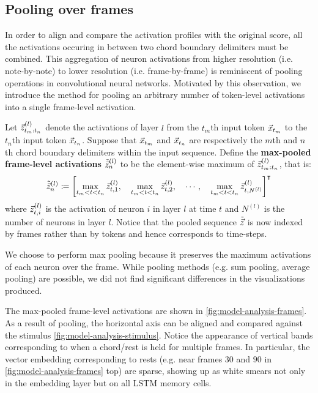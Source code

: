 \documentclass[dissertation.tex]{subfiles}
\begin{document}
\subsection{Pooling over frames}

In order to align and compare the activation profiles with the original score,
all the activations occuring in between two chord boundary delimiters must be
combined. This aggregation of neuron activations from higher resolution (i.e.
note-by-note) to lower resolution (i.e. frame-by-frame) is reminiscent of
pooling operations in convolutional neural networks. Motivated by
this observation, we introduce the method for pooling an arbitrary number of
token-level activations into a single frame-level activation.

Let $\vec{z}^{(l)}_{{t_m}:{t_n}}$ denote the activations of layer $l$ from the $t_m$th input token $\vec{x}_{t_m}$
to the $t_n$th input token $\vec{x}_{t_n}$. Suppose that $\vec{x}_{t_m}$ and $\vec{x}_{t_n}$ are respectively the
$m$th and $n$th chord boundary delimiters within the input sequence. Define the
\textbf{max-pooled frame-level activations} $\tilde{\vec{z}}^{(l)}_n$ to be the
element-wise maximum of $\vec{z}^{(l)}_{{t_m}:{t_n}}$, that is:
\begin{equation}
    \tilde{\vec{z}}^{(l)}_n \coloneqq \left[
        \max_{t_m < t < t_n} \vec{z}^{(l)}_{t,1},\quad
        \max_{t_m < t < t_n} \vec{z}^{(l)}_{t,2},\quad
        \cdots,\quad
        \max_{t_m < t < t_n} \vec{z}^{(l)}_{t,N^{(l)}}
    \right]^\intercal
\end{equation}
where $\vec{z}^{(l)}_{t,i}$ is the activation of neuron $i$ in layer $l$ at time $t$
and $N^{(l)}$ is the number of neurons in layer $l$. Notice that the pooled
sequence $\tilde{\vec{z}}$ is now indexed by frames rather than by tokens and hence
corresponds to time-steps.

We choose to perform max pooling because it preserves the maximum activations
of each neuron over the frame. While pooling methods (e.g. sum pooling, average
pooling) are possible, we did not find significant differences in the
visualizations produced.

The max-pooled frame-level activations are shown in
\cref{fig:model-analysis-frames}. As a result of pooling, the horizontal axis
can be aligned and compared against the stimulus
\cref{fig:model-analysis-stimulus}. Notice the appearance of vertical bands
corresponding to when a chord/rest is held for multiple frames. In particular,
the vector embedding corresponding to rests (e.g. near frames $30$ and $90$ in
\cref{fig:model-analysis-frames} top) are sparse, showing up as white smears
not only in the embedding layer but on all LSTM memory cells.
\end{document}
